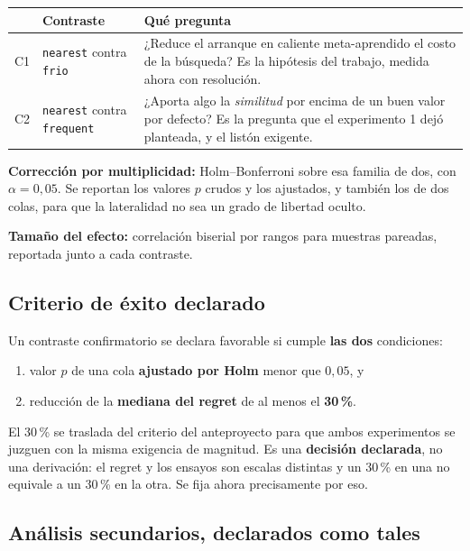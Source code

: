 \documentclass[11pt,letterpaper]{article}
\begin{document}
\begin{center}
\begin{tabularx}{\textwidth}{L{1.2cm} L{3.3cm} Y}
\toprule
{} & \textbf{Contraste} & \textbf{Qué pregunta} \\
\midrule
C1 & \texttt{nearest} contra \texttt{frio} &
¿Reduce el arranque en caliente meta-aprendido el costo de la búsqueda? Es la
hipótesis del trabajo, medida ahora con resolución. \\
\midrule
C2 & \texttt{nearest} contra \texttt{frequent} &
¿Aporta algo la \emph{similitud} por encima de un buen valor por defecto? Es la
pregunta que el experimento 1 dejó planteada, y el listón exigente. \\
\bottomrule
\end{tabularx}
\end{center}

\textbf{Corrección por multiplicidad:} Holm--Bonferroni sobre esa familia de dos, con
$\alpha = 0{,}05$. Se reportan los valores $p$ crudos y los ajustados, y también los
de dos colas, para que la lateralidad no sea un grado de libertad oculto.

\textbf{Tamaño del efecto:} correlación biserial por rangos para muestras pareadas,
reportada junto a cada contraste.

\subsection{Criterio de éxito declarado}

Un contraste confirmatorio se declara favorable si cumple \textbf{las dos}
condiciones:

\begin{enumerate}
  \item valor $p$ de una cola \textbf{ajustado por Holm} menor que $0{,}05$, y
  \item reducción de la \textbf{mediana del regret} de al menos el \textbf{30\,\%}.
\end{enumerate}

El 30\,\% se traslada del criterio del anteproyecto para que ambos experimentos se
juzguen con la misma exigencia de magnitud. Es una \textbf{decisión declarada}, no una
derivación: el regret y los ensayos son escalas distintas y un 30\,\% en una no
equivale a un 30\,\% en la otra. Se fija ahora precisamente por eso.

\subsection{Análisis secundarios, declarados como tales}
\end{document}
